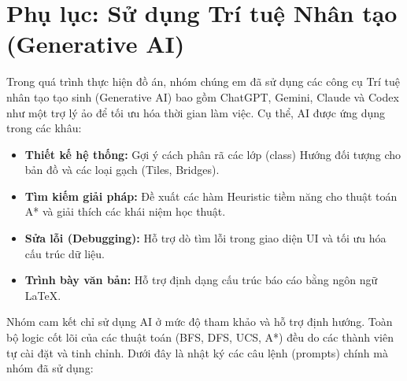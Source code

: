 \newpage
\section*{Phụ lục: Sử dụng Trí tuệ Nhân tạo (Generative AI)}

Trong quá trình thực hiện đồ án, nhóm chúng em đã sử dụng các công cụ Trí tuệ nhân tạo tạo sinh (Generative AI) bao gồm ChatGPT, Gemini, Claude và Codex như một trợ lý ảo để tối ưu hóa thời gian làm việc. Cụ thể, AI được ứng dụng trong các khâu:
\begin{itemize}
    \item \textbf{Thiết kế hệ thống:} Gợi ý cách phân rã các lớp (class) Hướng đối tượng cho bản đồ và các loại gạch (Tiles, Bridges).
    \item \textbf{Tìm kiếm giải pháp:} Đề xuất các hàm Heuristic tiềm năng cho thuật toán A* và giải thích các khái niệm học thuật.
    \item \textbf{Sửa lỗi (Debugging):} Hỗ trợ dò tìm lỗi trong giao diện UI và tối ưu hóa cấu trúc dữ liệu.
    \item \textbf{Trình bày văn bản:} Hỗ trợ định dạng cấu trúc báo cáo bằng ngôn ngữ LaTeX.
\end{itemize}

Nhóm cam kết chỉ sử dụng AI ở mức độ tham khảo và hỗ trợ định hướng. Toàn bộ logic cốt lõi của các thuật toán (BFS, DFS, UCS, A*) đều do các thành viên tự cài đặt và tinh chỉnh. Dưới đây là nhật ký các câu lệnh (prompts) chính mà nhóm đã sử dụng:

